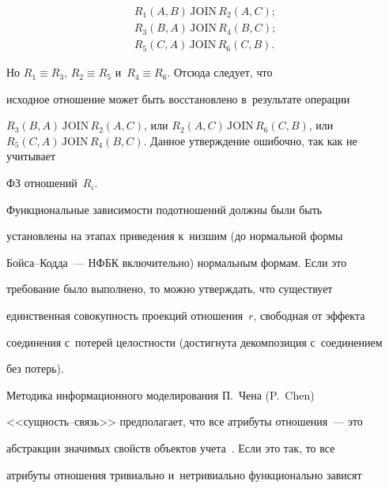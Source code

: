   \begin{equation*}

  \begin{array}{l}

  R_1(A,B)\, \mathrm{JOIN}\,R_2(A,C);\\[3pt]

  R_3(B,A)\, \mathrm{JOIN}\,R_4(B,C);\\[3pt]

  R_5(C,A)\, \mathrm{JOIN}\,R_6(C,B).

  \end{array}



  \end{equation*}

  

  Но $R_1\equiv R_3$, $R_2\equiv R_5$ и~$R_4\equiv R_6$. Отсюда следует, что 

исходное отношение может быть восстановлено в~результате операции 

  $R_3(B,A)\, \mathrm{JOIN}\, R_2(A,C)$, или $R_2(A,C)\, \mathrm{JOIN}\,R_6(C,B)$, или $R_5(C,A)\, 

\mathrm{JOIN}\,R_4(B,C)$. Данное утверж\-де\-ние ошибочно, так как не учитывает 

ФЗ отношений~$R_i$.

  

  Функциональные зависимости подотношений должны были быть 

установлены на этапах приведения к~низшим (до нормальной формы  

Бой\-са--Код\-да~--- НФБК включительно) нормальным формам. Если это 

требование было выполнено, то мож\-но утверж\-дать, что существует 

единственная совокупность проекций отношения~$r$, свободная от эффекта 

соединения с~потерей це\-лост\-ности (достигнута декомпозиция с~соединением 

без потерь).

  

  Методика информационного моделирования П.~Чена (P.~Chen)  

<<сущ\-ность--связь>> предполагает, что все атрибуты отношения~--- это 

абстракции значимых свойств объектов учета~\cite{14-iv}. Если это так, то все 

атрибуты отношения тривиально и~нетривиально функционально зависят 

